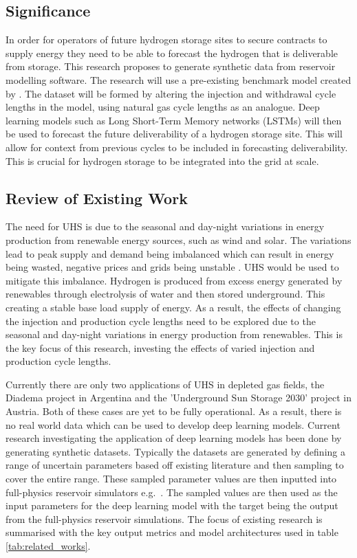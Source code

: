 \documentclass[12pt]{article}
\begin{document}
\subsection{Significance}
In order for operators of future hydrogen storage sites to secure contracts to supply energy they need to be able to forecast the hydrogen that is deliverable from storage. This research proposes to generate synthetic data from reservoir modelling software. The research will use a pre-existing benchmark model created by \citet{hogeweg2022benchmark}. The dataset will be formed by altering the injection and withdrawal cycle lengths in the model, using natural gas cycle lengths as an analogue. Deep learning models such as Long Short-Term Memory networks (LSTMs) will then be used to forecast the future deliverability of a hydrogen storage site. This will allow for context from previous cycles to be included in forecasting deliverability. This is crucial for hydrogen storage to be integrated into the grid at scale.  

\subsection{Review of Existing Work}

The need for UHS is due to the seasonal and day-night variations in energy production from renewable energy sources, such as wind and solar. The variations lead to peak supply and demand being imbalanced which can result in energy being wasted, negative prices and grids being unstable \cite{pellow2015hydrogen}. UHS would be used to mitigate this imbalance. Hydrogen is produced from excess energy generated by renewables through electrolysis of water and then stored underground. This creating a stable base load supply of energy. As a result, the effects of changing the injection and production cycle lengths need to be explored due to the seasonal and day-night variations in energy production from renewables. This is the key focus of this research, investing the effects of varied injection and production cycle lengths.

Currently there are only two applications of UHS in depleted gas fields, the Diadema project in Argentina and the 'Underground Sun Storage 2030' project in Austria. Both of these cases are yet to be fully operational. As a result, there is no real world data which can be used to develop deep learning models. Current research investigating the application of deep learning models has been done by generating synthetic datasets. Typically the datasets are generated by defining a range of uncertain parameters based off existing literature and then sampling to cover the entire range. These sampled parameter values are then inputted into full-physics reservoir simulators  e.g.\ \citep{mao2024efficient, MAOcushion, mao2025deep, fu2025deep, du2025combining, chellal2025quantitative}. The sampled values are then used as the input parameters for the deep learning model with the target being the output from the full-physics reservoir simulations. The focus of existing research is summarised with the key output metrics and model architectures used in table \ref{tab:related_works}. 
\end{document}
